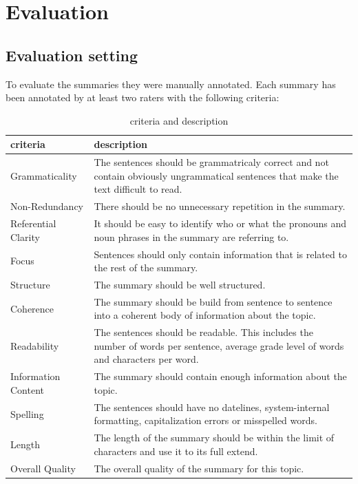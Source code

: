 
\section{Evaluation}
\label{ch:evaluation}

\subsection{Evaluation setting}
To evaluate the summaries they were manually annotated.
Each summary has been annotated by at least two raters with the following criteria:

\begin{table}[H]
	\begin{tabularx}{\textwidth}{l|X} \toprule
		criteria            & description \\ \midrule
		Grammaticality      & The sentences should be grammatricaly correct and not contain obviously ungrammatical sentences that make the text difficult to read.\\
		Non-Redundancy      & There should be no unnecessary repetition in the summary.\\
		Referential Clarity & It should be easy to identify who or what the pronouns and noun
  phrases in the summary are referring to.\\
		Focus               & Sentences should only contain information that is related to the rest of the summary.\\
		Structure           & The summary should be well structured.\\
		Coherence           & The summary should be build from sentence to sentence into a coherent body of information about the topic.\\
		Readability         & The sentences should be readable. This includes the number of words per sentence, average grade level of words and characters per word. \\
		Information Content & The summary should contain enough information about the topic.\\
		Spelling            & The sentences should have no datelines, system-internal formatting, capitalization errors or misspelled words.\\
		Length              & The length of the summary should be within the limit of characters and use it to its full extend.\\
		Overall Quality     & The overall quality of the summary for this topic.\\  \bottomrule    
	\end{tabularx}
	\caption{criteria and description}
	\label{tab:evacriteria}
\end{table}


